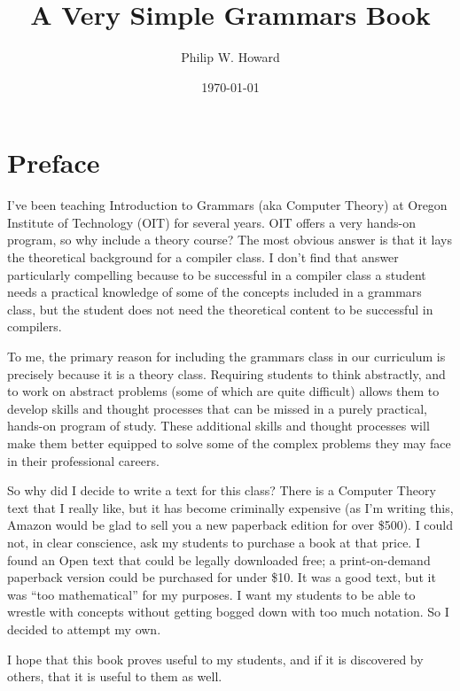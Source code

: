 \documentclass[letterpaper,12pt,openany,reqno]{book}%
\begin{document}
\tikzset{ >=Latex }

\frontmatter
\title{A Very Simple Grammars Book}
\author{Philip W. Howard}
\date{\today}
\maketitle
\tableofcontents
\listoffigures
\chapter{Preface}

I've been teaching Introduction to Grammars (aka Computer Theory) at Oregon Institute of Technology (OIT) for several years. OIT offers a very hands-on program, so why include a theory course? The most obvious answer is that it lays the theoretical background for a compiler class. I don't find that answer particularly compelling because to be successful in a compiler class a student needs a practical knowledge of some of the concepts included in a grammars class, but the student does not need the theoretical content to be successful in compilers.

To me, the primary reason for including the grammars class in our curriculum is precisely because it is a theory class. Requiring students to think abstractly, and to work on abstract problems (some of which are quite difficult) allows them to develop skills and thought processes that can be missed in a purely practical, hands-on program of study. These additional skills and thought processes will make them better equipped to solve some of the complex problems they may face in their professional careers.

So why did I decide to write a text for this class? There is a Computer Theory text that I really like, but it has become criminally expensive (as I'm writing this, Amazon would be glad to sell you a new paperback edition for over \$500). I could not, in clear conscience, ask my students to purchase a book at that price. I found an Open text that could be legally downloaded free; a print-on-demand paperback version could be purchased for under \$10. It was a good text, but it was ``too mathematical'' for my purposes. I want my students to be able to wrestle with concepts without getting bogged down with too much notation. So I decided to attempt my own.

I hope that this book proves useful to my students, and if it is discovered by others, that it is useful to them as well.
\end{document}
